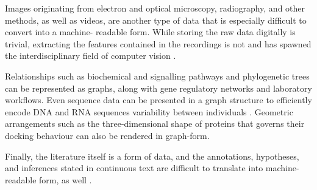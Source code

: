 \noindent
Images\label{mar:dataimages} originating from electron and
optical microscopy, radiography, and other methods, as well as videos, are
another type of data that is especially difficult to convert into a machine-%
readable form. While storing the raw data digitally is trivial, extracting the
features contained in the recordings is not and has spawned the
interdisciplinary field of computer vision \citep{Ballard1982}.
\medbreak

\noindent
Relationships\label{mar:datagraphs} such as biochemical and
signalling pathways and phylogenetic trees can be represented as graphs, along
with gene regulatory networks and laboratory workflows. Even sequence data can
be presented in a graph structure to efficiently encode DNA and RNA sequences
variability between individuals \citep{Novak2017}. Geometric arrangements such
as the three-dimensional shape of proteins that governs their docking
behaviour can also be rendered in graph-form.
\medbreak

\noindent
Finally,\label{mar:dataprose} the literature itself is a
form of data, and the annotations, hypotheses, and inferences stated in
continuous text are difficult to translate into machine-readable form, as well
\citep{Balyan2017}.
\bigbreak

